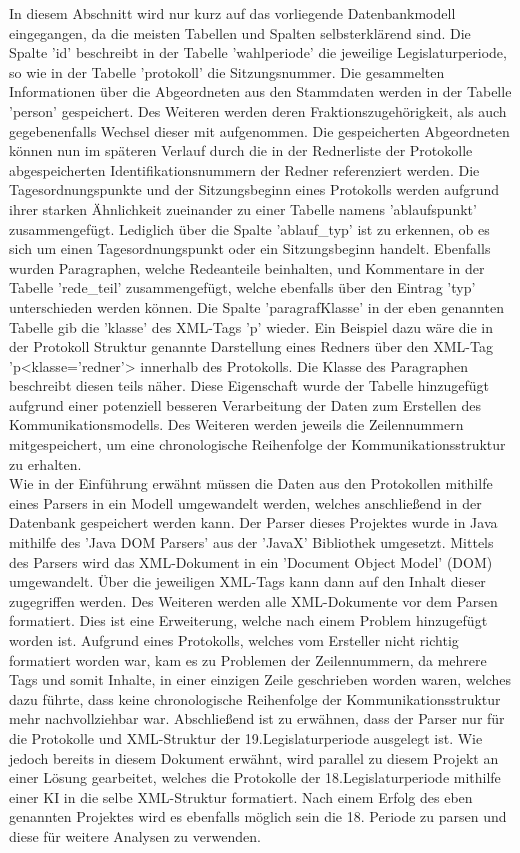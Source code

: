 In diesem Abschnitt wird nur kurz auf das vorliegende Datenbankmodell eingegangen, da die meisten Tabellen und Spalten selbsterklärend sind.
Die Spalte 'id' beschreibt in der Tabelle 'wahlperiode' die jeweilige Legislaturperiode, so wie in der Tabelle 'protokoll' die Sitzungsnummer. Die gesammelten Informationen über die Abgeordneten aus den Stammdaten werden in der Tabelle 'person' gespeichert. Des Weiteren werden deren Fraktionszugehörigkeit, als auch gegebenenfalls Wechsel dieser mit aufgenommen. Die gespeicherten Abgeordneten können nun im späteren Verlauf durch die in der Rednerliste der Protokolle abgespeicherten Identifikationsnummern der Redner referenziert werden. Die Tagesordnungspunkte und der Sitzungsbeginn eines Protokolls werden aufgrund ihrer starken Ähnlichkeit zueinander zu einer Tabelle namens 'ablaufspunkt' zusammengefügt. Lediglich über die Spalte 'ablauf\_typ' ist zu erkennen, ob es sich um einen Tagesordnungspunkt oder ein Sitzungsbeginn handelt. Ebenfalls wurden Paragraphen, welche Redeanteile beinhalten, und Kommentare in der Tabelle 'rede\_teil' zusammengefügt, welche ebenfalls über den Eintrag 'typ' unterschieden werden können. Die Spalte 'paragrafKlasse' in der eben genannten Tabelle gib die 'klasse' des XML-Tags 'p' wieder. Ein Beispiel dazu wäre die in der Protokoll Struktur genannte Darstellung eines Redners über den XML-Tag 'p<klasse='redner'> innerhalb des Protokolls. Die Klasse des Paragraphen beschreibt diesen teils näher. Diese Eigenschaft wurde der Tabelle hinzugefügt aufgrund einer potenziell besseren Verarbeitung der Daten zum Erstellen des Kommunikationsmodells. Des Weiteren werden jeweils die Zeilennummern mitgespeichert, um eine chronologische Reihenfolge der Kommunikationsstruktur zu erhalten.\\
Wie in der Einführung erwähnt müssen die Daten aus den Protokollen mithilfe eines Parsers in ein Modell umgewandelt werden, welches anschließend in der Datenbank gespeichert werden kann. Der Parser dieses Projektes wurde in Java mithilfe des 'Java DOM Parsers' aus der 'JavaX' Bibliothek umgesetzt. Mittels des Parsers wird das XML-Dokument in ein 'Document Object Model' (DOM) umgewandelt. Über die jeweiligen XML-Tags kann dann auf den Inhalt dieser zugegriffen werden. Des Weiteren werden alle XML-Dokumente vor dem Parsen formatiert. Dies ist eine Erweiterung, welche nach einem Problem hinzugefügt worden ist. Aufgrund eines Protokolls, welches vom Ersteller nicht richtig formatiert worden war, kam es zu Problemen der Zeilennummern, da mehrere Tags und somit Inhalte, in einer einzigen Zeile geschrieben worden waren, welches dazu führte, dass keine chronologische Reihenfolge der Kommunikationsstruktur mehr nachvollziehbar war.
Abschließend ist zu erwähnen, dass der Parser nur für die Protokolle und XML-Struktur der 19.Legislaturperiode ausgelegt ist. Wie jedoch bereits in diesem Dokument erwähnt, wird parallel zu diesem Projekt an einer Lösung gearbeitet, welches die Protokolle der 18.Legislaturperiode mithilfe einer KI in die selbe XML-Struktur formatiert. Nach einem Erfolg des eben genannten Projektes wird es ebenfalls möglich sein die 18. Periode zu parsen und diese für weitere Analysen zu verwenden.


